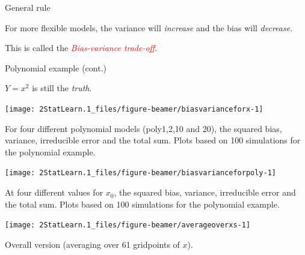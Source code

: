 \documentclass[ignorenonframetext,]{beamer}
\begin{document}
\begin{frame}

\begin{block}{General rule}

\vspace{4mm}

For more flexible models, the variance will \emph{increase} and the bias
will \emph{decrease}.

\vspace{4mm}

\centering
This is called the \emph{\textcolor{red}{Bias-variance trade-off}}.

\end{block}

\end{frame}

\begin{frame}

\begin{block}{Polynomial example (cont.)}

\(Y=x^2\) is still the \emph{truth}.

\begin{center}\texttt{[image: 2StatLearn.1\_files/figure-beamer/biasvarianceforx-1]} \end{center}

For four different polynomial models (poly1,2,10 and 20), the squared
bias, variance, irreducible error and the total sum. Plots based on 100
simulations for the polynomial example.

\end{block}

\end{frame}

\begin{frame}

\begin{center}\texttt{[image: 2StatLearn.1\_files/figure-beamer/biasvarianceforpoly-1]} \end{center}

At four different values for \(x_0\), the squared bias, variance,
irreducible error and the total sum. Plots based on 100 simulations for
the polynomial example.

\end{frame}

\begin{frame}

\begin{center}\texttt{[image: 2StatLearn.1\_files/figure-beamer/averageoverxs-1]} \end{center}

Overall version (averaging over 61 gridpoints of \(x\)).

\end{frame}
\end{document}

